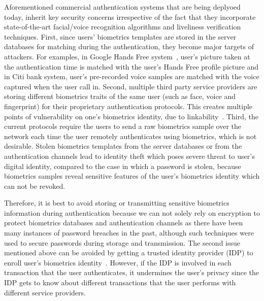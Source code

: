 \documentclass[10pt]{article}
\begin{document}
Aforementioned commercial authentication systems that are being deplyoed today, inherit key security 
concerns irrespective of the fact that they incorporate state-of-the-art facial/voice recognition algorithms and liveliness verification techniques. 
First, since users' biometrics templates are stored in the server databases for matching during the authentication, they become major targets 
of attackers.
For examples, in Google Hands Free system~\cite{google}, user's picture taken at the authentication time is matched with the user's Hands Free 
profile picture and in Citi bank system, user's pre-recorded voice samples are matched with the voice captured when the user call in. Second, 
multiple third party service providers are storing different biometrics traits of the same user (such as face, voice and fingerprint) for their 
proprietary authentication protocols. This creates multiple points of vulnerability on one's biometrics identity, due to 
linkability~\cite{linkability}. Third, the current protocols require the users to send a raw biometrics sample over the network each time the user 
remotely authenticates using biometrics, which is not desirable.
Stolen biometrics templates from the server databases or from the authentication channels lead to identity theft which poses severe threat to user's 
digital identity, compared to the case in which a password is stolen, because biometrics samples reveal sensitive features of the user's 
biometrics identity which can not be revoked.

Therefore, it is best to avoid storing or transmitting sensitive biometrics information during authentication because we can not solely rely on 
encryption to protect biometrics databases and authentication channels as there have been many instances of 
password breaches in the past, although such techniques were used to secure passwords during storage and transmission.
The second issue mentioned above can be avoided by getting a trusted identity provider (IDP) to enroll user's biometrics identity~\cite{google, 
identityX}. However, if the IDP is involved in each transaction that the user authenticates, it undermines the user's privacy since the IDP gets to 
know about different transactions that the user performs with different service providers.
  
\end{document}
